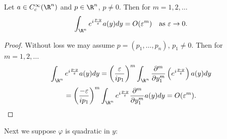 \begin{lemma}
\label{lem:stationary-phase-linear-asymptotics}
Let $a \in C_c^\infty(\R^n)$ and $p \in \R^n$, $p \neq 0$. Then for $m = 1,2,\ldots$
$$\int_{\R^n} e^{i\frac{p \cdot y}{\varepsilon}} a(y) dy = O(\varepsilon^m) \quad \text{as } \varepsilon \to 0.$$
\end{lemma}
\begin{proof}
Without loss we may assume $p = (p_1,\ldots,p_n)$, $p_1 \neq 0$. Then for $m = 1,2,\ldots$
$$\int_{\R^n} e^{i\frac{p \cdot y}{\varepsilon}} a(y) dy = \left(\frac{\varepsilon}{i p_1}\right)^m \int_{\R^n} \frac{\partial^m}{\partial y_1^m}\left(e^{i\frac{p \cdot y}{\varepsilon}}\right) a(y) dy$$
$$= \left(\frac{-\varepsilon}{i p_1}\right)^m \int_{\R^n} e^{i\frac{p \cdot y}{\varepsilon}} \frac{\partial^m}{\partial y_1^m} a(y) dy = O(\varepsilon^m).$$
\end{proof}

Next we suppose $\varphi$ is quadratic in $y$:

